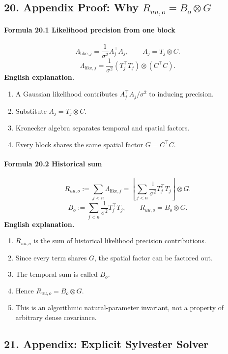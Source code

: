 \documentclass[12pt]{article}
\begin{document}
\subsection{20. Appendix Proof: Why \(R_{uu,o}=B_o\otimes G\)}
\paragraph{Formula 20.1 Likelihood precision from one block}
\[
\Lambda_{\mathrm{like},j}
=
\frac1{\sigma^2}A_j^\top A_j,
\qquad
A_j=T_j\otimes C.
\]
\[
\Lambda_{\mathrm{like},j}
=
\frac1{\sigma^2}(T_j^\top T_j)\otimes(C^\top C).
\]
\textbf{English explanation.}
\begin{enumerate}[leftmargin=2em]
\item A Gaussian likelihood contributes \(A_j^\top A_j/\sigma^2\) to inducing precision.
\item Substitute \(A_j=T_j\otimes C\).
\item Kronecker algebra separates temporal and spatial factors.
\item Every block shares the same spatial factor \(G=C^\top C\).
\end{enumerate}

\paragraph{Formula 20.2 Historical sum}
\[
R_{uu,o}
:=
\sum_{j<n}\Lambda_{\mathrm{like},j}
=
\left[
\sum_{j<n}\frac1{\sigma^2}T_j^\top T_j
\right]\otimes G.
\]
\[
B_o:=
\sum_{j<n}\frac1{\sigma^2}T_j^\top T_j,
\qquad
R_{uu,o}=B_o\otimes G.
\]
\textbf{English explanation.}
\begin{enumerate}[leftmargin=2em]
\item \(R_{uu,o}\) is the sum of historical likelihood precision contributions.
\item Since every term shares \(G\), the spatial factor can be factored out.
\item The temporal sum is called \(B_o\).
\item Hence \(R_{uu,o}=B_o\otimes G\).
\item This is an algorithmic natural-parameter invariant, not a property of arbitrary dense covariance.
\end{enumerate}

\subsection{21. Appendix: Explicit Sylvester Solver}
\end{document}
